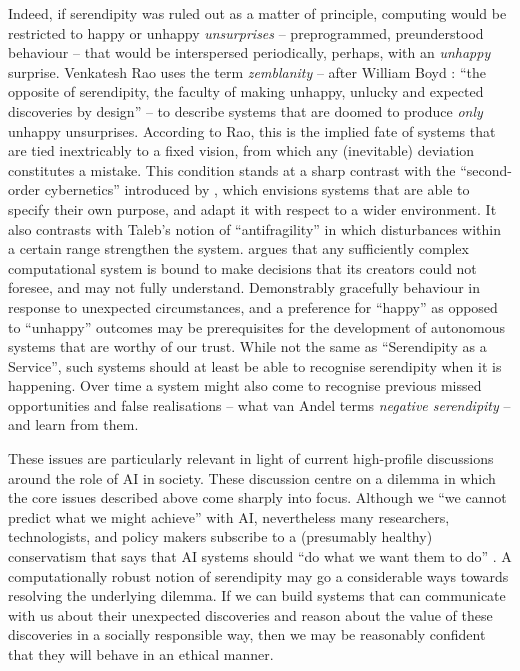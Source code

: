 Indeed, if serendipity was ruled out as a matter of principle, computing would
be restricted to happy or unhappy \emph{unsurprises} -- preprogrammed,
preunderstood behaviour -- that would be interspersed periodically,
perhaps, with an \emph{unhappy} surprise.  Venkatesh Rao
\citeyearpar{rao2015breaking} uses the term \emph{zemblanity} -- after
William Boyd \citeyearpar{boyd2010armadillo}: ``the
opposite of serendipity, the faculty of making unhappy, unlucky and
expected discoveries by design'' -- to describe systems that are
doomed to produce \emph{only} unhappy unsurprises.  According to Rao, this is
the implied fate of systems that are tied inextricably to a fixed
vision, from which any (inevitable) deviation constitutes a mistake.  This condition
stands at a sharp contrast with the ``second-order cybernetics''
introduced by , which envisions systems that
are able to specify their own purpose, and adapt it with respect to a
wider environment.  It also contrasts with Taleb's
\citeyearpar{taleb2012antifragile} notion of ``antifragility'' in
which disturbances within a certain range strengthen the system.
 argues that any sufficiently complex
computational system is bound to make decisions that its creators
could not foresee, and may not fully understand.  Demonstrably
gracefully behaviour in response to unexpected circumstances, and a
preference for ``happy'' as opposed to ``unhappy'' outcomes may be
prerequisites for the development of autonomous systems that are
worthy of our trust.  While not the same as ``Serendipity as a
Service'', such systems should at least be able to recognise
serendipity when it is happening.  Over time a system might also come
to recognise previous missed opportunities and false realisations --
what van Andel \citeyearpar[p.~639]{van1994anatomy} terms \emph{negative
  serendipity} -- and learn from them.

These issues are particularly relevant in light of current
high-profile discussions around the role of AI in society.  These
discussion centre on a dilemma in which the core issues described
above come sharply into focus.  Although we ``we cannot predict what
we might achieve'' with AI, nevertheless many researchers,
technologists, and policy makers subscribe to a (presumably healthy)
conservatism that says that AI systems should ``do what we want them
to do'' \cite{research-priorities}.  A computationally robust notion
of serendipity may go a considerable ways towards resolving the
underlying dilemma.  If we can build systems that can communicate with
us about their unexpected discoveries and reason about the value of
these discoveries in a socially responsible way, then we may be
reasonably confident that they will behave in an ethical manner.

